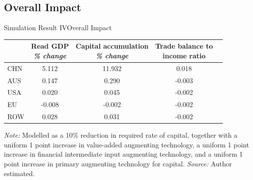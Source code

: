\documentclass{beamer}
\begin{document}
\subsection{Overall Impact}
\begin{frame}{Simulation Result IV}{Overall Impact}
\begin{table}
\begin{threeparttable}
\def\theadset{\def\arraytretch{1.5}}
\def\arraystretch{1.2}
\small
\begin{tabular}{lcccc}
\hline\hline
    & \thead{Read GDP\\\emph{\% change}} 
    & \thead{Capital accumulation\\\emph{\% change}} 
    & \thead{Trade balance to\\income ratio} \\
\hline
CHN & 5.112 &	11.932 & 0.018 \\
AUS & 0.147 &	0.290  & -0.003 \\
USA & 0.020 &	0.045  & -0.002 \\
EU  & -0.008 &	-0.002 & -0.002 \\
ROW & 0.028 &	0.031  & -0.002 \\
\hline\hline
\end{tabular}
\begin{tablenotes}
\emph{Note:} Modelled as a 10\% reduction in required rate of capital, 
together with a uniform 1 point increase in value-added augmenting technology,  
a uniform 1 point increase in financial intermediate input augmenting technology, 
and a uniform 1 point increase in primary augmenting technology for capital.
\emph{Source:} Author estimated.
\end{tablenotes}
\end{threeparttable}
\end{table}   
\end{frame}
\end{document}
